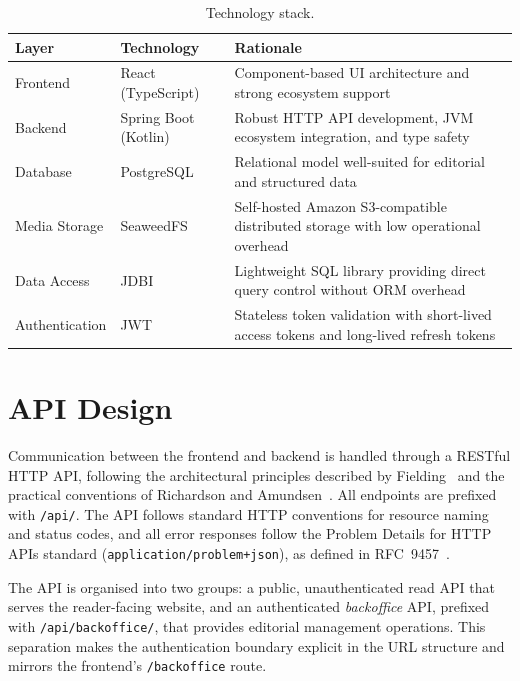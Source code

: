 \begin{table}[H]
      \centering
      \caption{Technology stack.}
      \label{tab:tech_stack}
      \begin{tabularx}{\textwidth}{llX}
            \toprule
            \textbf{Layer} & \textbf{Technology}  & \textbf{Rationale}                                                                      \\
            \midrule
            Frontend       & React (TypeScript)   & Component-based UI architecture and strong ecosystem support                            \\
            Backend        & Spring Boot (Kotlin) & Robust HTTP API development, JVM ecosystem integration, and type safety                 \\
            Database       & PostgreSQL           & Relational model well-suited for editorial and structured data                          \\
            Media Storage  & SeaweedFS            & Self-hosted Amazon S3-compatible distributed storage with low operational overhead      \\
            Data Access    & JDBI                 & Lightweight SQL library providing direct query control without ORM overhead             \\
            Authentication & JWT                  & Stateless token validation with short-lived access tokens and long-lived refresh tokens \\
            \bottomrule
      \end{tabularx}
\end{table}

\section{API Design} \label{sec:arch_api}

Communication between the frontend and backend is handled through a
RESTful HTTP API, following the architectural principles described by
Fielding~\cite{fielding2000rest} and the practical conventions of
Richardson and Amundsen~\cite{richardson2013restful}. All endpoints are prefixed with \texttt{/api/}.
The API follows standard HTTP conventions for resource naming and status codes,
and all error responses follow the Problem Details for HTTP APIs standard
(\texttt{application/problem+json}), as defined in RFC~9457~\cite{rfc9457}.

The API is organised into two groups: a public, unauthenticated read API that
serves the reader-facing website, and an authenticated \textit{backoffice} API,
prefixed with \texttt{/api/backoffice/}, that provides editorial management
operations. This separation makes the authentication boundary explicit in the URL
structure and mirrors the frontend's \texttt{/backoffice} route.

